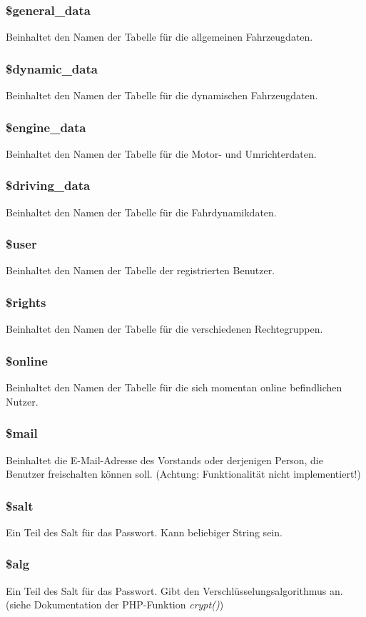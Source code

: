 \documentclass[fontsize = 12pt, paper = a4]{scrreprt}
\begin{document}
\subsubsection*{\$general\_data}
Beinhaltet den Namen der Tabelle für die allgemeinen Fahrzeugdaten.
\subsubsection*{\$dynamic\_data}
Beinhaltet den Namen der Tabelle für die dynamischen Fahrzeugdaten.
\subsubsection*{\$engine\_data}
Beinhaltet den Namen der Tabelle für die Motor- und Umrichterdaten.
\subsubsection*{\$driving\_data}
Beinhaltet den Namen der Tabelle für die Fahrdynamikdaten.
\subsubsection*{\$user}
Beinhaltet den Namen der Tabelle der registrierten Benutzer.
\subsubsection*{\$rights}
Beinhaltet den Namen der Tabelle für die verschiedenen Rechtegruppen.
\subsubsection*{\$online}
Beinhaltet den Namen der Tabelle für die sich momentan online befindlichen Nutzer.
\subsubsection*{\$mail}
Beinhaltet die E-Mail-Adresse des Vorstands oder derjenigen Person, die Benutzer freischalten können soll. (Achtung: Funktionalität nicht implementiert!)
\subsubsection*{\$salt}
Ein Teil des Salt für das Passwort. Kann beliebiger String sein.
\subsubsection*{\$alg}
Ein Teil des Salt für das Passwort. Gibt den Verschlüsselungsalgorithmus an. (siehe Dokumentation der PHP-Funktion \textit{crypt()})
\end{document}
